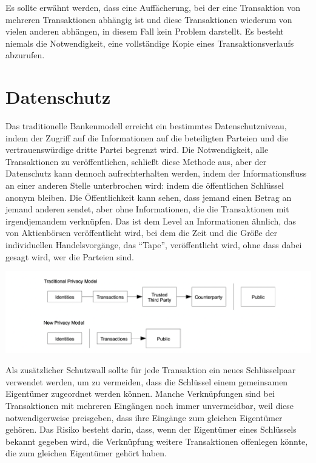 \documentclass[9pt]{article}
\begin{document}
	Es sollte erwähnt werden, dass eine Auffächerung, bei der eine Transaktion von mehreren Transaktionen abhängig ist und diese Transaktionen wiederum von vielen anderen abhängen, in diesem Fall kein Problem darstellt. Es besteht niemals die Notwendigkeit, eine vollständige Kopie eines Transaktionsverlaufs abzurufen.
	
	\newpage
	
	\section{Datenschutz}
	
	Das traditionelle Bankenmodell erreicht ein bestimmtes Datenschutzniveau, indem der Zugriff auf die Informationen auf die beteiligten Parteien und die vertrauenswürdige dritte Partei begrenzt wird. Die Notwendigkeit, alle Transaktionen zu veröffentlichen, schließt diese Methode aus, aber der Datenschutz kann dennoch aufrechterhalten werden, indem der Informationsfluss an einer anderen Stelle unterbrochen wird: indem die öffentlichen Schlüssel anonym bleiben. Die Öffentlichkeit kann sehen, dass jemand einen Betrag an jemand anderen sendet, aber ohne Informationen, die die Transaktionen mit irgendjemandem verknüpfen. Das ist dem Level an Informationen ähnlich, das von Aktienbörsen veröffentlicht wird, bei dem die Zeit und die Größe der individuellen Handelsvorgänge, das \enquote{Tape}, veröffentlicht wird, ohne dass dabei gesagt wird, wer die Parteien sind.
	
	\begin{center}
		\includegraphics[scale=0.3]{pics/privacy.png}
	\end{center}
	
	Als zusätzlicher Schutzwall sollte für jede Transaktion ein neues Schlüsselpaar verwendet werden, um zu vermeiden, dass die Schlüssel einem gemeinsamen Eigentümer zugeordnet werden können. Manche Verknüpfungen sind bei Transaktionen mit mehreren Eingängen noch immer unvermeidbar, weil diese notwendigerweise preisgeben, dass ihre Eingänge zum gleichen Eigentümer gehören. Das Risiko besteht darin, dass, wenn der Eigentümer eines Schlüssels bekannt gegeben wird, die Verknüpfung weitere Transaktionen offenlegen könnte, die zum gleichen Eigentümer gehört haben.
	
\end{document}
